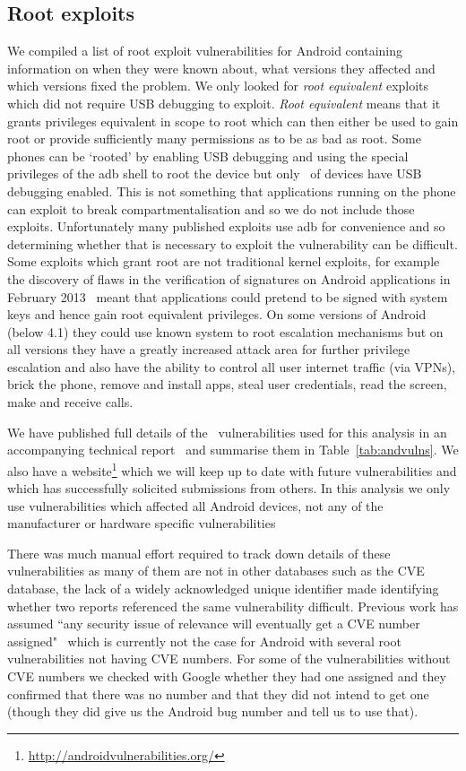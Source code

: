 \documentclass[conference,a4paper,twoside]{IEEEtran}
\begin{document}
\subsection{Root exploits}
We compiled a list of root exploit vulnerabilities for Android containing information on when they were known about, what versions they affected and which versions fixed the problem.
We only looked for \emph{root equivalent} exploits which did not require USB debugging to exploit.
\emph{Root equivalent} means that it grants privileges equivalent in scope to root which can then either be used to gain root or provide sufficiently many permissions as to be as bad as root.
Some phones can be `rooted' by enabling USB debugging and using the special privileges of the adb shell to root the device but only \daAdbEnabledPerc\ of devices have USB debugging enabled.
This is not something that applications running on the phone can exploit to break compartmentalisation and so we do not include those exploits.
Unfortunately many published exploits use adb for convenience and so determining whether that is necessary to exploit the vulnerability can be difficult.
Some exploits which grant root are not traditional kernel exploits, for example the discovery of flaws in the verification of signatures on Android applications in February 2013~\cite{Forristal2013} meant that applications could pretend to be signed with system keys and hence gain root equivalent privileges.
On some versions of Android (below 4.1) they could use known system to root escalation mechanisms but on all versions they have a greatly increased attack area for further privilege escalation and also have the ability to control all user internet traffic (via VPNs), brick the phone, remove and install apps, steal user credentials, read the screen, make and receive calls.

We have published full details of the \daNumVulnsUsed\ vulnerabilities used for this analysis in an accompanying technical report~\cite{TODO} and summarise them in Table~\ref{tab:andvulns}.
We also have a website\footnote{\url{http://androidvulnerabilities.org/}} which we will keep up to date with future vulnerabilities and which has successfully solicited submissions from others.
In this analysis we only use vulnerabilities which affected all Android devices, not any of the manufacturer or hardware specific vulnerabilities

There was much manual effort required to track down details of these vulnerabilities as many of them are not in other databases such as the CVE database, the lack of a widely acknowledged unique identifier made identifying whether two reports referenced the same vulnerability difficult.
Previous work has assumed ``any security issue of relevance will eventually get a CVE number assigned"~\cite{Frei2010} which is currently not the case for Android with several root vulnerabilities not having CVE numbers.
For some of the vulnerabilities without CVE numbers we checked with Google whether they had one assigned and they confirmed that there was no number and that they did not intend to get one (though they did give us the Android bug number and tell us to use that).
\end{document}
